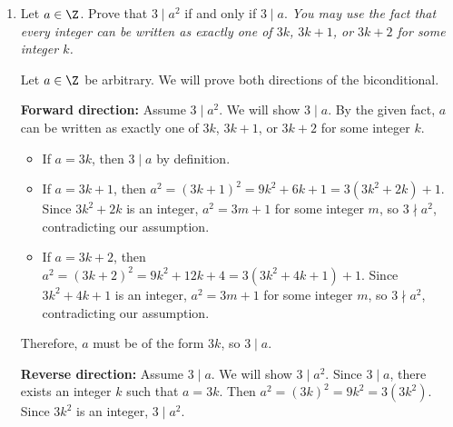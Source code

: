 \begin{enumerate}
  Moreover, the following definitions are provided from in-class 
  activities (ICA) and in-webwork contents.

  \begin{define}{Divisibility}
    An integer $n$ divides an integer $m$, denoted $n \mid m$, if there 
    exist an integer $k$ such that $m=n k$. Otherwise, $n \nmid m$.
  \end{define}

  \begin{define}{Set Difference}
    Let $A$, $B$ be subsets of a universal set $\mathcal{U}$.
    The set difference $A \setminus B$ is defined to be the set
    $\{ x \in \mathcal{U} \mid x \in A \text{ and } x \notin B\}$. \\
    \textit{It is sometimes called the relative complement of $B$ in $A$, and 
    denoted in the textbook as $A - B$.}
  \end{define}

  \item Let $a \in \Z$.  Prove that $3 \mid a^2$ if and only if $3 \mid a$.
  \label{lemma1}
  \textit{You may use the fact that every integer can be written as 
  exactly one of $3k$, $3k + 1$, or $3k+2$ for some integer $k$.}
  \begin{subprove}
    Let $a \in \Z$ be arbitrary. We will prove both directions of the biconditional.
    
    \textbf{Forward direction:} Assume $3 \mid a^2$. We will show $3 \mid a$.
    By the given fact, $a$ can be written as exactly one of $3k$, $3k + 1$, or $3k+2$ for some integer $k$.
    \begin{itemize}
      \item If $a = 3k$, then $3 \mid a$ by definition.
      \item If $a = 3k + 1$, then $a^2 = (3k + 1)^2 = 9k^2 + 6k + 1 = 3(3k^2 + 2k) + 1$. Since $3k^2 + 2k$ is an integer, $a^2 = 3m + 1$ for some integer $m$, so $3 \nmid a^2$, contradicting our assumption.
      \item If $a = 3k + 2$, then $a^2 = (3k + 2)^2 = 9k^2 + 12k + 4 = 3(3k^2 + 4k + 1) + 1$. Since $3k^2 + 4k + 1$ is an integer, $a^2 = 3m + 1$ for some integer $m$, so $3 \nmid a^2$, contradicting our assumption.
    \end{itemize}
    Therefore, $a$ must be of the form $3k$, so $3 \mid a$.
    
    \textbf{Reverse direction:} Assume $3 \mid a$. We will show $3 \mid a^2$.
    Since $3 \mid a$, there exists an integer $k$ such that $a = 3k$.
    Then $a^2 = (3k)^2 = 9k^2 = 3(3k^2)$.
    Since $3k^2$ is an integer, $3 \mid a^2$.
    

\end{subprove}
\end{enumerate}
